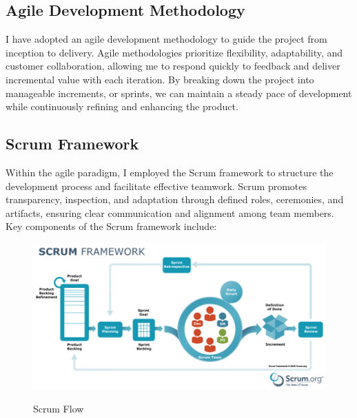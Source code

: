 \documentclass[12pt,a4paper]{report}
\begin{document}
\subsection{Agile Development Methodology}
I have adopted an agile development methodology to guide the project from inception to delivery. Agile methodologies prioritize flexibility, adaptability, and customer collaboration, allowing me to respond quickly to feedback and deliver incremental value with each iteration. By breaking down the project into manageable increments, or sprints, we can maintain a steady pace of development while continuously refining and enhancing the product.

\subsection{Scrum Framework}
Within the agile paradigm, I employed the Scrum framework to structure the development process and facilitate effective teamwork. Scrum promotes transparency, inspection, and adaptation through defined roles, ceremonies, and artifacts, ensuring clear communication and alignment among team members. Key components of the Scrum framework include:

\begin{figure}[h]
  \centering
  \includegraphics[width=5.5in]{scrum-framework-with-sdo-logo-9.29.23.png}\\[1.5cm]
  \caption{Scrum Flow}
  \label{fig:example}
\end{figure}
\end{document}
